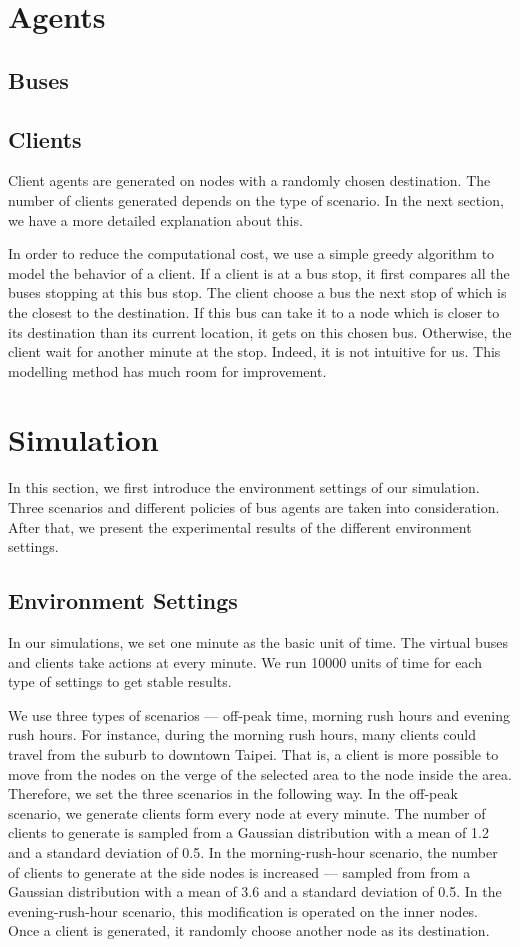 \documentclass{sig-alternate}
\begin{document}
\section{Agents}
\subsection{Buses}
\subsection{Clients}
Client agents are generated on nodes with a randomly chosen destination.
The number of clients generated depends on the type of scenario.
In the next section, we have a more detailed explanation about this.

In order to reduce the computational cost, we use a simple greedy algorithm to model the behavior of a client.
If a client is at a bus stop, it first compares all the buses stopping at this bus stop.
The client choose a bus the next stop of which is the closest to the destination.
If this bus can take it to a node which is closer to its destination than its current location, it gets on this chosen bus.
Otherwise, the client wait for another minute at the stop.
Indeed, it is not intuitive for us.
This modelling method has much room for improvement.

\section{Simulation}
In this section, we first introduce the environment settings of our simulation.
Three scenarios and different policies of bus agents are taken into consideration.
After that, we present the experimental results of the different environment settings.

\subsection{Environment Settings}
In our simulations, we set one minute as the basic unit of time.
The virtual buses and clients take actions at every minute.
We run 10000 units of time for each type of settings to get stable results.

We use three types of scenarios --- off-peak time, morning rush hours and evening rush hours.
For instance, during the morning rush hours, many clients could travel from the suburb to downtown Taipei.
That is, a client is more possible to move from the nodes on the verge of the selected area to the node inside the area.
Therefore, we set the three scenarios in the following way.
In the off-peak scenario, we generate clients form every node at every minute.
The number of clients to generate is sampled from a Gaussian distribution with a mean of 1.2 and a standard deviation of 0.5.
In the morning-rush-hour scenario, the number of clients to generate at the side nodes is increased --- sampled from from a Gaussian distribution with a mean of 3.6 and a standard deviation of 0.5.
In the evening-rush-hour scenario, this modification is operated on the inner nodes.
Once a client is generated, it randomly choose another node as its destination.
\end{document}
